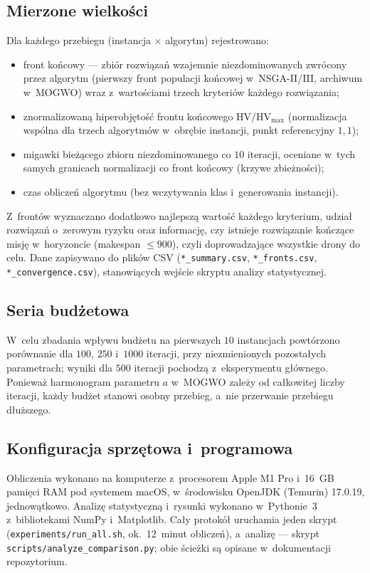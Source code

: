 \subsection{Mierzone wielkości}
\label{sec:wyniki_pomiary}
Dla każdego przebiegu (instancja $\times$ algorytm) rejestrowano:
\begin{itemize}
    \item front końcowy --- zbiór rozwiązań wzajemnie niezdominowanych zwrócony
    przez algorytm (pierwszy front populacji końcowej w~NSGA-II/III, archiwum
    w~MOGWO) wraz z~wartościami trzech kryteriów każdego rozwiązania;
    \item znormalizowaną hiperobjętość frontu końcowego
    $\mathrm{HV}/\mathrm{HV}_{\max}$ (normalizacja wspólna dla trzech
    algorytmów w~obrębie instancji, punkt referencyjny $1{,}1$);
    \item migawki bieżącego zbioru niezdominowanego co $10$ iteracji, oceniane
    w~tych samych granicach normalizacji co front końcowy (krzywe zbieżności);
    \item czas obliczeń algorytmu (bez wczytywania klas i~generowania instancji).
\end{itemize}
Z~frontów wyznaczano dodatkowo najlepszą wartość każdego kryterium, udział
rozwiązań o~zerowym ryzyku oraz informację, czy istnieje rozwiązanie kończące
misję w~horyzoncie (makespan $\leq 900$), czyli doprowadzające wszystkie drony
do celu. Dane zapisywano do plików CSV (\texttt{*\_summary.csv},
\texttt{*\_fronts.csv}, \texttt{*\_convergence.csv}), stanowiących wejście
skryptu analizy statystycznej.

\subsection{Seria budżetowa}
\label{sec:wyniki_seria}
W~celu zbadania wpływu budżetu na pierwszych $10$ instancjach powtórzono
porównanie dla $100$, $250$ i~$1000$ iteracji, przy niezmienionych pozostałych
parametrach; wyniki dla $500$ iteracji pochodzą z~eksperymentu głównego.
Ponieważ harmonogram parametru $a$ w~MOGWO zależy od całkowitej liczby
iteracji, każdy budżet stanowi osobny przebieg, a~nie przerwanie przebiegu
dłuższego.

\subsection{Konfiguracja sprzętowa i~programowa}
\label{sec:wyniki_konfiguracja}
Obliczenia wykonano na komputerze z~procesorem Apple M1 Pro i~16~GB pamięci
RAM pod systemem macOS, w~środowisku OpenJDK (Temurin) 17.0.19, jednowątkowo.
Analizę statystyczną i~rysunki wykonano w~Pythonie~3 z~bibliotekami NumPy
i~Matplotlib. Cały protokół uruchamia jeden skrypt
(\texttt{experiments/run\_all.sh}, ok.~12~minut obliczeń), a~analizę --- skrypt
\texttt{scripts/analyze\_comparison.py}; obie ścieżki są opisane w~dokumentacji
repozytorium.

